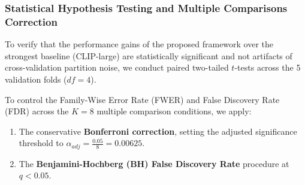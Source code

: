 \subsubsection{Statistical Hypothesis Testing and Multiple Comparisons Correction}
To verify that the performance gains of the proposed framework over the strongest baseline (CLIP-large) are statistically significant and not artifacts of cross-validation partition noise, we conduct paired two-tailed $t$-tests across the 5 validation folds ($df = 4$).

To control the Family-Wise Error Rate (FWER) and False Discovery Rate (FDR) across the $K=8$ multiple comparison conditions, we apply:
\begin{enumerate}
    \item The conservative \textbf{Bonferroni correction}, setting the adjusted significance threshold to $\alpha_{adj} = \frac{0.05}{8} = 0.00625$.
    \item The \textbf{Benjamini-Hochberg (BH) False Discovery Rate} procedure at $q < 0.05$.
\end{enumerate}

